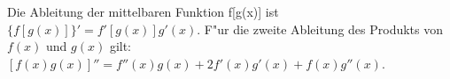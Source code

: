 \documentclass{article}
\begin{document}
Die Ableitung der mittelbaren Funktion f[g(x)] ist
$\{f[g(x)]\}' = f'[g(x)]g'(x)$. F"ur die zweite Ableitung des
Produkts von $f(x)$ und $g(x)$ gilt: $[f(x)g(x)]'' = f''(x)g(x) + 2f'(x)g'(x)
+ f(x)g''(x)$.
\end{document}
